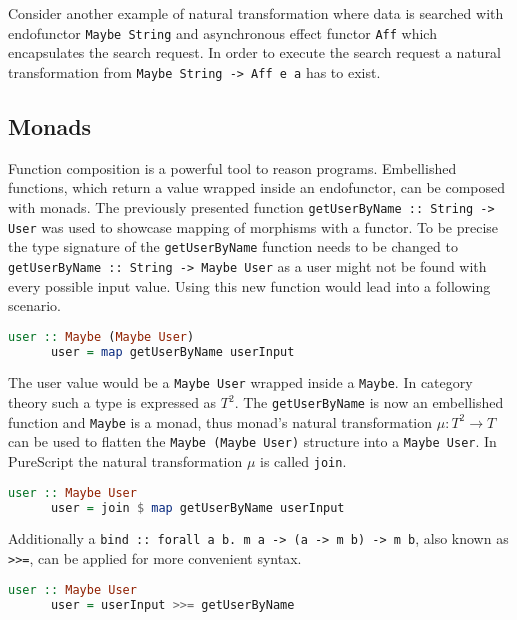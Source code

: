 \documentclass[article]{aaltoseries}
\begin{document}
    Consider another example of natural transformation where data is searched
    with endofunctor \lstinline|Maybe String| and asynchronous effect functor
    \lstinline|Aff| which encapsulates the search request. In order to execute
    the search request a natural transformation from
    \lstinline|Maybe String -> Aff e a| has to exist.


  \subsection{Monads}
    Function composition is a powerful tool to reason programs. Embellished
    functions, which return a value wrapped inside an endofunctor, can be
    composed with monads. The previously presented function
    \lstinline|getUserByName :: String -> User| was used to showcase mapping of
    morphisms with a functor. To be precise the type signature of the
    \lstinline|getUserByName| function needs to be changed to
    \lstinline|getUserByName :: String -> Maybe User| as a user might not be
    found with every possible input value. Using this new function would lead
    into a following scenario.
 
    \begin{lstlisting}[language=Haskell]
      user :: Maybe (Maybe User)
      user = map getUserByName userInput
    \end{lstlisting}
 
    The user value would be a \lstinline|Maybe User| wrapped inside a
    \lstinline|Maybe|. In category theory such a type is expressed as $T^2$. The
    \lstinline|getUserByName| is now an embellished function and
    \lstinline|Maybe| is a monad, thus monad’s natural transformation $\mu : T^2
    \rightarrow T$ can be used to flatten the \lstinline|Maybe (Maybe User)|
    structure into a \lstinline|Maybe User|. In PureScript the natural
    transformation $\mu$ is called \lstinline|join|.
 
    \begin{lstlisting}[language=Haskell]
      user :: Maybe User
      user = join $ map getUserByName userInput
    \end{lstlisting} 

    Additionally a \lstinline|bind :: forall a b. m a -> (a -> m b) -> m b|,
    also known as \lstinline|>>=|, can be applied for more convenient syntax.
 
    \begin{lstlisting}[language=Haskell]
      user :: Maybe User
      user = userInput >>= getUserByName
    \end{lstlisting}
\end{document}
